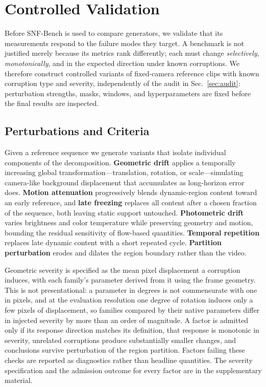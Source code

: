 \section{Controlled Validation}
\label{sec:validation}

Before SNF-Bench is used to compare generators, we validate that its measurements respond to the failure modes they target. A benchmark is not justified merely because its metrics rank differently; each must change \emph{selectively}, \emph{monotonically}, and in the expected direction under known corruptions. We therefore construct controlled variants of fixed-camera reference clips with known corruption type and severity, independently of the audit in Sec.~\ref{sec:audit}: perturbation strengths, masks, windows, and hyperparameters are fixed before the final results are inspected.

\subsection{Perturbations and Criteria}
\label{sec:mechanistic_validation}

Given a reference sequence we generate variants that isolate individual components of the decomposition. \textbf{Geometric drift} applies a temporally increasing global transformation---translation, rotation, or scale---simulating camera-like background displacement that accumulates as long-horizon error does. \textbf{Motion attenuation} progressively blends dynamic-region content toward an early reference, and \textbf{late freezing} replaces all content after a chosen fraction of the sequence, both leaving static support untouched. \textbf{Photometric drift} varies brightness and color temperature while preserving geometry and motion, bounding the residual sensitivity of flow-based quantities. \textbf{Temporal repetition} replaces late dynamic content with a short repeated cycle. \textbf{Partition perturbation} erodes and dilates the region boundary rather than the video.

Geometric severity is specified as the mean pixel displacement a corruption induces, with each family's parameter derived from it using the frame geometry. This is not presentational: a parameter in degrees is not commensurate with one in pixels, and at the evaluation resolution one degree of rotation induces only a few pixels of displacement, so families compared by their native parameters differ in injected severity by more than an order of magnitude. A factor is admitted only if its response direction matches its definition, that response is monotonic in severity, unrelated corruptions produce substantially smaller changes, and conclusions survive perturbation of the region partition. Factors failing these checks are reported as diagnostics rather than headline quantities. The severity specification and the admission outcome for every factor are in the supplementary material.

